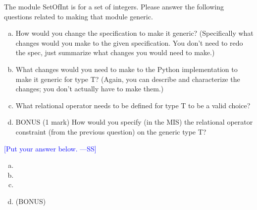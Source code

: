 \documentclass[12pt,fleqn]{examtst}
\newcommand{\authornote}[3]{\textcolor{#1}{[#3 ---#2]}}
\newcommand{\authornote}[3]{}
\newcommand{\wss}[1]{\authornote{blue}{SS}{#1}}
\begin{document}
\noindent
\begin{minipage}{\textwidth}

The module SetOfInt is for a set of integers.  Please answer the following
questions related to making that module generic. 
\begin{enumerate}[a.]
\item How would you change the specification to make it generic?  (Specifically
  what changes would you make to the given specification.  You don't need to
  redo the spec, just summarize what changes you would need to make.)
\item What changes would you need to make to the Python
implementation to make it generic for type T?  (Again, you can describe and
characterize the changes; you don't actually have to make them.)
\item What relational operator needs to be defined for type T to be a valid
  choice?
\item BONUS (1 mark) How would you specify (in the MIS) the relational operator
  constraint (from the previous question) on the generic type T?
\end{enumerate}

\wss{Put your answer below.}

\begin{enumerate}[a.]
\item
\item
\item
\item (BONUS)
\end{enumerate}

\end{minipage}
\end{document}
